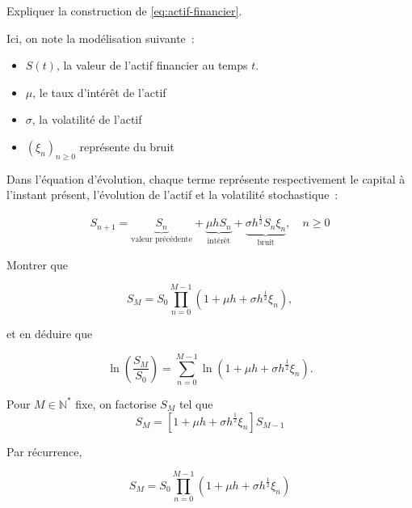 \documentclass[answers, 10pt]{exam}
\begin{document}
\begin{questions}
	\question 
	Expliquer la construction de \cref{eq:actif-financier}.

	\begin{solutionorbox}
		Ici, on note la modélisation suivante~:
		
		\begin{itemize}
			\item $S(t)$, la valeur de l'actif financier au temps $t$.
			\item $\mu$, le taux d'intérêt de l'actif
			\item $\sigma$, la volatilité de l'actif
			\item $(\xi_n)_{n\geq 0}$ représente du bruit
		\end{itemize}

		Dans l'équation d'évolution, chaque terme représente
		respectivement le capital à l'instant présent, l'évolution de
		l'actif et la volatilité stochastique~:

		\begin{equation*}
			S_{n+1} = \underbrace{S_n}_{\text{valeur précédente}} 
			+ \underbrace{\mu h S_n}_{\text{intérêt}} 
			+ \underbrace{\sigma h^{ \frac{1}{2} } S_n \xi_n}_{\text{bruit}}
			,\quad n \geq 0 
		\end{equation*}

	\end{solutionorbox}

	\question
	Montrer que

	\begin{equation*}
		S_M = S_0 \prod_{n=0}^{M-1} (1 + \mu h + \sigma h^{\frac{1}{2}} \xi_n
)		,
	\end{equation*}

	et en déduire que 

	\begin{equation*}
		\ln \left( \frac{S_M}{S_0} \right) = \sum_{n=0}^{M-1} \ln(1 + \mu h + \sigma h^{\frac{1}{2}} \xi_n).
	\end{equation*}

	\begin{solutionorbox}
		Pour $M\in \mathbb{N}^*$ fixe, on factorise $S_M$ tel que 
		\begin{equation*}
			S_M = \left[ 1 + \mu h + \sigma h^{\frac{1}{2}} \xi_{n}\right] S_{M-1}
		\end{equation*}	

		Par récurrence,

		\begin{equation*}
			S_M = S_0 \prod_{n=0}^{M-1}  (1 + \mu h + \sigma h^{\frac{1}{2}}\xi_n
) 		\end{equation*}
		

\end{solutionorbox}
\end{questions}
\end{document}
